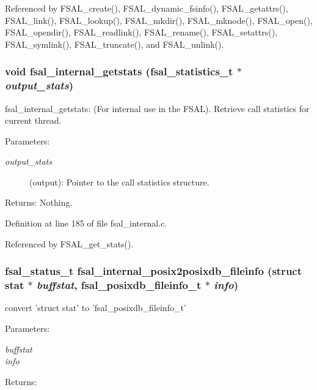 Referenced by FSAL\_\-create(), FSAL\_\-dynamic\_\-fsinfo(), FSAL\_\-getattrs(), FSAL\_\-link(), FSAL\_\-lookup(), FSAL\_\-mkdir(), FSAL\_\-mknode(), FSAL\_\-open(), FSAL\_\-opendir(), FSAL\_\-readlink(), FSAL\_\-rename(), FSAL\_\-setattrs(), FSAL\_\-symlink(), FSAL\_\-truncate(), and FSAL\_\-unlink().
\subsubsection{\setlength{\rightskip}{0pt plus 5cm}void fsal\_\-internal\_\-getstats (fsal\_\-statistics\_\-t $\ast$ {\em output\_\-stats})}\label{fsal__internal_8c_a15}


fsal\_\-internal\_\-getstats: (For internal use in the FSAL). Retrieve call statistics for current thread.

\begin{Desc}
\item[Parameters:]
\begin{description}
\item[{\em output\_\-stats}](output): Pointer to the call statistics structure.\end{description}
\end{Desc}
\begin{Desc}
\item[Returns:]Nothing. \end{Desc}


Definition at line 185 of file fsal\_\-internal.c.

Referenced by FSAL\_\-get\_\-stats().
\subsubsection{\setlength{\rightskip}{0pt plus 5cm}fsal\_\-status\_\-t fsal\_\-internal\_\-posix2posixdb\_\-fileinfo (struct stat $\ast$ {\em buffstat}, fsal\_\-posixdb\_\-fileinfo\_\-t $\ast$ {\em info})}\label{fsal__internal_8c_a20}


convert 'struct stat' to 'fsal\_\-posixdb\_\-fileinfo\_\-t' 

\begin{Desc}
\item[Parameters:]
\begin{description}
\item[{\em buffstat}]\item[{\em info}]\end{description}
\end{Desc}
\begin{Desc}
\item[Returns:]\end{Desc}


